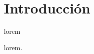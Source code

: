 \section{Introducción}

\begin{frame}{lorem}
    \begin{block}{lorem.}

    \end{block}


\end{frame}
